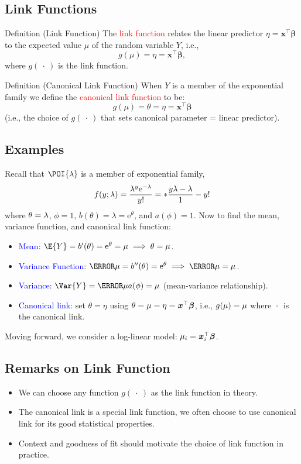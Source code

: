 \documentclass{article}\usepackage[]{graphicx}\usepackage[svgnames]{xcolor}
\let\exp\relax%
\let\log\relax%
\providecommand{\Vector}[1]{\bm{#1}}%
\begin{document}
\subsection*{Link Functions}
\begin{Regular}{Definition (Link Function)}
    The \textcolor{Red}{link function} relates the linear predictor $ \eta=\Vector{x}^\top\Vector{\beta} $ to the expected value $ \mu $ of the random variable $ Y $, i.e.,
    \[ g(\mu)=\eta=\Vector{x}^\top\Vector{\beta}, \]
    where $ g(\:\cdot\:) $ is the link function.
\end{Regular}
\begin{Regular}{Definition (Canonical Link Function)}
    When $Y$ is a member of the exponential family we define the \textcolor{Red}{canonical link function} to be:
    \[ g(\mu)=\theta=\eta=\Vector{x}^\top\Vector{\beta} \]
    (i.e., the choice of $ g(\:\cdot\:) $ that sets canonical parameter = linear predictor).
\end{Regular}
\subsection*{Examples}
Recall that $ \POI{\lambda} $ is a member of exponential family,
\[ f(y;\lambda)=\frac{\lambda^y \mathrm{e}^{-\lambda}}{y!}=\exp*{\frac{y\log{\lambda}-\lambda}{1}-\log{y!}}  \]
where $ \theta=\log{\lambda} $, $ \phi=1 $, $ b(\theta)=\lambda=\mathrm{e}^{\theta} $, and $ a(\phi)=1 $. Now to find the mean, variance function, and canonical link function:
\begin{itemize}
    \item \textcolor{Blue}{Mean}: $ \E{Y}=b^\prime(\theta)=\mathrm{e}^{\theta}=\mu\implies \theta=\log{\mu} $.
    \item \textcolor{Blue}{Variance Function}: $ \V{\mu}=b^{\prime\prime}(\theta)=\mathrm{e}^{\theta}\implies \V{\mu}=\mu $.
    \item \textcolor{Blue}{Variance}: $ \Var{Y}=\V{\mu}a(\phi)=\mu $ (mean-variance relationship).
    \item \textcolor{Blue}{Canonical link}: set $ \theta=\eta $ using $ \theta=\log{\mu}=\eta=\Vector{x}^\top \Vector{\beta} $, i.e., $ g(\mu)=\log{\mu} $ where $ \log{\:\cdot\:} $
          is the canonical link.
\end{itemize}
Moving forward, we consider a log-linear model: $ \log{\mu_i}=\Vector{x}_i^\top \Vector{\beta} $.

\subsection*{Remarks on Link Function}
\begin{itemize}
    \item We can choose any function $ g(\:\cdot\:) $ as the link function in theory.
    \item The canonical link is a special link function, we often choose to use
          canonical link for its good statistical properties.
    \item Context and goodness of fit should motivate the choice of link function in
          practice.
\end{itemize}
\end{document}
